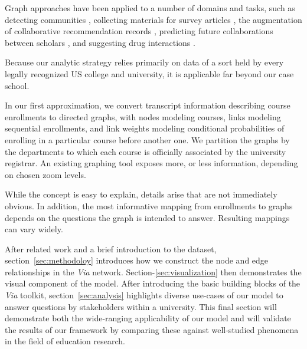 Graph approaches have been applied to a number of
domains and tasks, such as detecting communities
\cite{Fortunato2004}, collecting materials for survey articles
\cite{ji2015}, the augmentation of collaborative recommendation
records \cite{huang2005}, predicting future collaborations between
scholars \cite{liben2007}, and suggesting drug interactions
\cite{zitnik2018}.

Because our analytic strategy relies primarily on data of a sort held by every legally recognized US college and university, it is applicable far beyond our case school. 


In our first approximation, we convert transcript information describing course enrollments to directed graphs, with nodes modeling courses, links modeling sequential enrollments, and link weights modeling conditional probabilities of enrolling in a particular course before another one. We partition the graphs by the departments to which each course is officially associated by the university registrar. An existing graphing tool \cite{shannon2003cytoscape} exposes more, or less information, depending on chosen zoom levels.

While the concept is easy to explain, details arise that are not
immediately obvious. In addition, the most informative mapping from
enrollments to graphs depends on the questions the graph is intended
to answer. Resulting mappings can vary widely.


After related work and a brief introduction to the dataset, section~\ref{sec:methodoloy} introduces how we construct the node and edge relationships in the \textit{Via} network. Section-\ref{sec:visualization} then demonstrates the visual component of the model. After introducing the basic building blocks of the \textit{Via} toolkit, section~\ref{sec:analysis} highlights diverse use-cases of our model to answer questions by stakeholders within a university. This final section will demonstrate both the wide-ranging applicability of our model and will validate the results of our framework by comparing these against well-studied phenomena in the field of education research.


